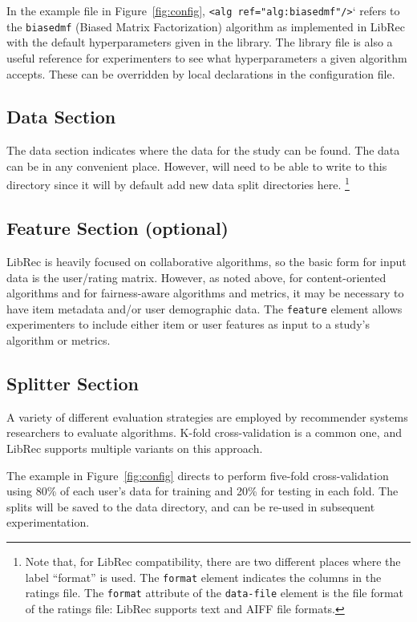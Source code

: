 In the example file in Figure~\ref{fig:config}, \texttt{<alg ref="alg:biasedmf"/>}` refers to the \texttt{biasedmf} (Biased Matrix Factorization) algorithm as implemented in LibRec with the default hyperparameters given in the library. The library file is also a useful reference for experimenters to see what hyperparameters a given algorithm accepts. These can be overridden by local declarations in the configuration file.

\subsection{Data Section}
\label{subsec:libauto_data_sec}

The data section indicates where the data for the study can be found. The data can be in any convenient place. However, \libauto{} will need to be able to write to this directory since it will by default add new data split directories here. \footnote{Note that, for LibRec compatibility, there are two different places where the label ``format'' is used. The \texttt{format} element indicates the columns in the ratings file. The \texttt{format} attribute of the \texttt{data-file} element is the file format of the ratings file: LibRec supports text and AIFF file formats.}

\subsection{Feature Section (optional)}
\label{subsec:libauto_feature_selection}

LibRec is heavily focused on collaborative algorithms, so the basic form for input data is the user/rating matrix. However, as noted above, for content-oriented algorithms and for fairness-aware algorithms and metrics, it may be necessary to have item metadata and/or user demographic data. The \texttt{feature} element allows experimenters to include either item or user features as input to a study's algorithm or metrics. 

\subsection{Splitter Section}
\label{subsec:libauto_splitter}
A variety of different evaluation strategies are employed by recommender systems researchers to evaluate algorithms. K-fold cross-validation is a common one, and LibRec supports multiple variants on this approach. 

The example in Figure~\ref{fig:config} directs \libauto{} to perform five-fold cross-validation using 80\% of each user's data for training and 20\% for testing in each fold. The splits will be saved to the data directory, and can be re-used in subsequent experimentation. 

